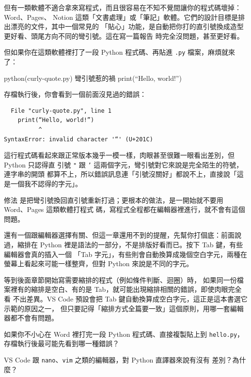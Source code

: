 但有一類軟體不適合拿來寫程式，而且很容易在不知不覺間讓你的程式碼壞掉：Word、Pages、
Notion 這類「文書處理」或「筆記」軟體。它們的設計目標是排出漂亮的文件，其中一個常見的
「貼心」功能，是自動把你打的直引號換成造型更好看、頭尾方向不同的彎引號。這在寫一篇報告
時完全沒問題，甚至更好看。

但如果你在這類軟體裡打了一段 Python 程式碼、再貼進
\texttt{.py} 檔案，麻煩就來了：

\begin{example}{python}{(curly-quote.py) 彎引號惹的禍}
print(“Hello, world!”)
\end{example}

存檔執行後，你會看到一個前面沒見過的錯誤：

\begin{verbatim}
  File "curly-quote.py", line 1
    print(“Hello, world!”)
          ^
SyntaxError: invalid character '“' (U+201C)
\end{verbatim}

這行程式碼看起來跟正常版本幾乎一模一樣，肉眼甚至很難一眼看出差別，但 Python 只認得直
引號 \texttt{"} 跟 \texttt{'} 這兩個字元，彎引號對它來說是完全陌生的符號，連字串的開頭
都算不上，所以錯誤訊息連「引號沒關好」都說不上，直接說「這是一個我不認得的字元」。

修法
是把彎引號換回直引號重新打過；更根本的做法，是一開始就不要用 Word、Pages 這類軟體打程式
碼，寫程式全程都在編輯器裡進行，就不會有這個問題。


還有一個跟編輯器選擇有關、但這一章還用不到的提醒，先幫你打個底：前面說過，縮排在
Python 裡是語法的一部分，不是排版好看而已。按下 Tab 鍵，有些編輯器會真的插入一個
「Tab 字元」，有些則會自動換算成幾個空白字元，兩種在螢幕上看起來可能一樣整齊，但對
Python 來說是不同的字元。

等到後面章節開始寫需要縮排的程式（例如條件判斷、迴圈）時，
如果同一份檔案裡有的縮排是空白、有的是 Tab，就可能出現縮排相關的錯誤，即使肉眼完全看
不出差異。VS Code 預設會把 Tab 鍵自動換算成空白字元，這正是這本書選它示範的原因之一，
但只要記得「縮排方式全篇要一致」這個原則，用哪一套編輯器都不會有問題。

\begin{drills}[label=drills:editor-pitfalls]
\item 如果你不小心在 Word 裡打完一段 Python 程式碼、直接複製貼上到 \texttt{hello.py}，
存檔執行後最可能先看到哪一種錯誤？
\item VS Code 跟 \texttt{nano}、\texttt{vim} 之類的編輯器，對 Python 直譯器來說有沒有
差別？為什麼？
\end{drills}

